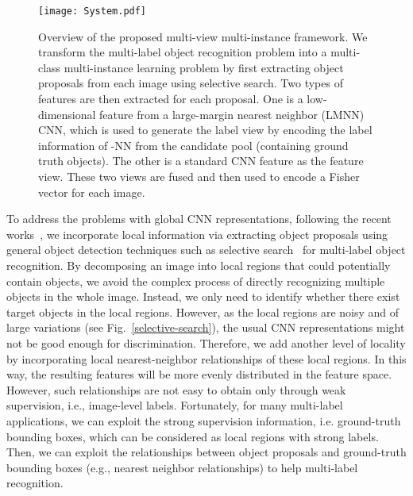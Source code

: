 \documentclass[10pt,twocolumn,letterpaper]{article}
\begin{document}
\begin{figure*}
  \centering
 \texttt{[image: System.pdf]}
 \caption{Overview of the proposed multi-view multi-instance framework. We transform the multi-label object recognition problem into a multi-class multi-instance learning problem by first extracting object proposals from each image using selective search. Two types of features are then extracted for each proposal. One is a low-dimensional feature from a large-margin nearest neighbor (LMNN) CNN, which is used to generate the label view by encoding the label information of -NN from the candidate pool (containing ground truth objects). The other is a standard CNN feature as the feature view. These two views are fused and then used to encode a Fisher vector for each image.}
 \label{system}
\end{figure*}

To address the problems with global CNN representations, following the recent works~\cite{Oquab2014,Wei2014,OquabCVPR2014,girshick2014}, we incorporate local information via extracting object proposals using general object detection techniques such as selective search~\cite{Uijlings2013} for multi-label object recognition. By decomposing an image into
local regions that could potentially contain objects, we avoid the complex process
of directly recognizing multiple objects
in the whole image. Instead, we only need to identify whether
there exist target objects in the local regions. However, as the
local regions are noisy and of large variations (see
Fig.~\ref{selective-search}), the usual CNN representations might
not be good enough for discrimination. Therefore, we add another
level of locality by incorporating local nearest-neighbor
relationships of these local regions. In this way, the resulting features will be more evenly
distributed in the feature space. However, such relationships are not easy
to obtain only through weak supervision, i.e., image-level labels.
Fortunately, for many multi-label applications, we can exploit the
strong supervision information, i.e. ground-truth bounding boxes, which can be considered as local regions with strong labels. Then, we can
exploit the relationships between object proposals and ground-truth bounding boxes (e.g.,
nearest neighbor relationships) to help multi-label recognition.
\end{document}
